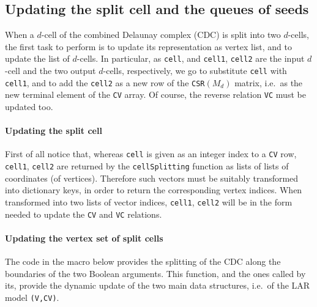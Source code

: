 \documentclass[11pt,oneside]{article}	%
\begin{document}
\subsection{Updating the split cell and the queues of seeds}

When a $d$-cell of the combined Delaunay complex (CDC) is split into two $d$-cells, the first task to perform is to update its representation as vertex list, and to update the list of $d$-cells. In particular, as \texttt{cell}, and \texttt{cell1}, \texttt{cell2} are the input $d$-cell and the two output $d$-cells, respectively, we go to substitute \texttt{cell} with \texttt{cell1}, and to add the \texttt{cell2} as a new row of the \texttt{CSR}$(M_d)$ matrix, i.e.~as the new terminal element of the \texttt{CV} array. Of course, the reverse relation \texttt{VC} must be updated too.

\paragraph{Updating the split cell} 
First of all notice that, whereas \texttt{cell} is given as an integer index to a \texttt{CV} row,
\texttt{cell1}, \texttt{cell2} are returned by the \texttt{cellSplitting} function as lists of lists of coordinates (of vertices). Therefore such vectors must be suitably transformed into dictionary keys, in order to return the corresponding vertex indices. When transformed into two lists of vector indices, \texttt{cell1}, \texttt{cell2} will be in the form needed to update the \texttt{CV} and \texttt{VC} relations.

\paragraph{Updating the vertex set of split cells}
The code in the macro below provides the splitting of the CDC along the boundaries of the two Boolean arguments.
This function, and the ones called by its, provide the dynamic update of the two main data structures, i.e.~of the LAR model \texttt{(V,CV)}.
\end{document}
